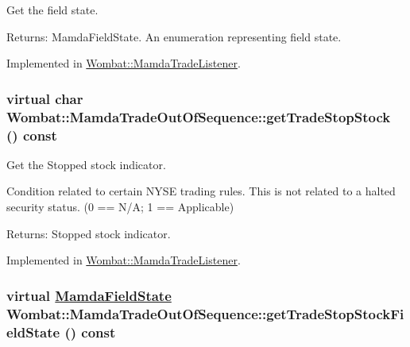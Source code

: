 Get the field state. 

\begin{Desc}
\item[Returns:]Mamda\-Field\-State. An enumeration representing field state. \end{Desc}


Implemented in \hyperlink{classWombat_1_1MamdaTradeListener_2090b9605a4191bf78b5cef58c7e1fbe}{Wombat::Mamda\-Trade\-Listener}.\hypertarget{classWombat_1_1MamdaTradeOutOfSequence_648c384ede932f120d0005dd9419fa32}{
\subsubsection[getTradeStopStock]{\setlength{\rightskip}{0pt plus 5cm}virtual char Wombat::Mamda\-Trade\-Out\-Of\-Sequence::get\-Trade\-Stop\-Stock () const}}
\label{classWombat_1_1MamdaTradeOutOfSequence_648c384ede932f120d0005dd9419fa32}


Get the Stopped stock indicator. 

Condition related to certain NYSE trading rules. This is not related to a halted security status. (0 == N/A; 1 == Applicable)

\begin{Desc}
\item[Returns:]Stopped stock indicator. \end{Desc}


Implemented in \hyperlink{classWombat_1_1MamdaTradeListener_2d4333ba424d00cbda5e88a846ef3c8c}{Wombat::Mamda\-Trade\-Listener}.\hypertarget{classWombat_1_1MamdaTradeOutOfSequence_c8c1bfde9213edffe475933823525ec9}{
\subsubsection[getTradeStopStockFieldState]{\setlength{\rightskip}{0pt plus 5cm}virtual \hyperlink{namespaceWombat_93aac974f2ab713554fd12a1fa3b7d2a}{Mamda\-Field\-State} Wombat::Mamda\-Trade\-Out\-Of\-Sequence::get\-Trade\-Stop\-Stock\-Field\-State () const}}
\label{classWombat_1_1MamdaTradeOutOfSequence_c8c1bfde9213edffe475933823525ec9}


